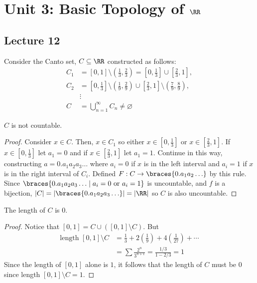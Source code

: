 \section{Unit 3: Basic Topology of $\RR$}
\subsection{Lecture 12}
Consider the Canto set, $C \subseteq \RR$ constructed as follows: 
\begin{align*}
    C_1 &= [0, 1] \setminus \left(\frac{1}{3}, \frac{2}{3}\right) = \left[0, \frac{1}{3}\right] \cup \left[\frac{2}{3}, 1\right], \\
    C_2 &= \left[0, \frac{1}{3}\right] \setminus \left(\frac{1}{9}, \frac{2}{9}\right) \cup \left[\frac{2}{3}, 1\right] \setminus \left(\frac{7}{9}, \frac{8}{9}\right), \\
    &\vdots \\
    C &= \bigcup_{n=1}^{\infty} C_n \neq \varnothing
\end{align*}

\begin{lma}{}
    $C$ is not countable.
    \begin{proof}
        Consider $x \in C$. Then, $x \in C_1$ so either $x \in \left[0, \frac{1}{3}\right]$ or $x \in \left[\frac{2}{3}, 1\right]$. If $x \in \left[0, \frac{1}{3}\right]$ let $a_1 = 0$ and if $x \in \left[\frac{2}{3}, 1\right]$ let $a_1 = 1$. Continue in this way, constructing $a=0.a_1a_2a_3\ldots$ where $a_i = 0$ if $x$ is in the left interval and $a_i = 1$ if $x$ is in the right interval of $C_i$. Defined $F: C \to \braces{0.a_1a_2\ldots}$ by this rule. Since $\braces{0.a_1a_2a_3\ldots \mid a_i = 0 \text{ or } a_i = 1}$ is uncountable, and $f$ is a bijection, $|C| = |\braces{0.a_1a_2a_3\ldots}| = |\RR|$ so $C$ is also uncountable.
    \end{proof}
\end{lma}

\begin{lma}{}
    The length of $C$ is $0$.
    \begin{proof}
        Notice that $[0, 1] = C \cup \left([0, 1] \setminus C\right)$. But 
        \begin{align*}
            \text{length } [0, 1] \setminus C  &= \frac{1}{3} + 2\left(\frac{1}{9}\right) + 4\left(\frac{1}{27}\right) + \cdots \\
            &= \sum \frac{2^n}{3^{n+1}} = \frac{1/3}{1 - 2/3} = 1
        \end{align*}
        Since the length of $[0, 1]$ alone is $1$, it follows that the length of $C$ must be $0$ since length $[0, 1] \setminus C = 1$.
    \end{proof}
\end{lma}

